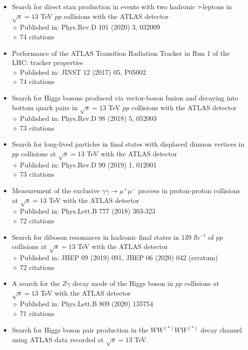 \documentclass[margin, 10pt]{res} %
\begin{document}
\begin{resume}
\begin{itemize}
\item Search for direct stau production in events with two hadronic $\tau$-leptons in $\sqrt{s} = 13$ TeV $pp$ collisions with the ATLAS detector\\
$\diamond$ Published in: Phys.Rev.D 101 (2020) 3, 032009\\
$\diamond$ 74 citations
\item Performance of the ATLAS Transition Radiation Tracker in Run 1 of the LHC: tracker properties\\
$\diamond$ Published in: JINST 12 (2017) 05, P05002\\
$\diamond$ 74 citations
\item Search for Higgs bosons produced via vector-boson fusion and decaying into bottom quark pairs in $\sqrt{s} = 13$ TeV $pp$ collisions with the ATLAS detector\\
$\diamond$ Published in: Phys.Rev.D 98 (2018) 5, 052003\\
$\diamond$ 73 citations
\item Search for long-lived particles in final states with displaced dimuon vertices in $pp$ collisions at $\sqrt{s} = 13$ TeV with the ATLAS detector\\
$\diamond$ Published in: Phys.Rev.D 99 (2019) 1, 012001\\
$\diamond$ 73 citations
\item Measurement of the exclusive $\gamma \gamma \rightarrow \mu^{+} \mu^{-}$ process in proton-proton collisions at $\sqrt{s} = 13$ TeV with the ATLAS detector\\
$\diamond$ Published in: Phys.Lett.B 777 (2018) 303-323\\
$\diamond$ 72 citations
\item Search for diboson resonances in hadronic final states in 139 fb$^{-1}$ of $pp$ collisions at $\sqrt{s} = 13$ TeV with the ATLAS detector\\
$\diamond$ Published in: JHEP 09 (2019) 091, JHEP 06 (2020) 042 (erratum)\\
$\diamond$ 72 citations
\item A search for the $Z\gamma$ decay mode of the Higgs boson in $pp$ collisions at $\sqrt{s} = 13$ TeV with the ATLAS detector\\
$\diamond$ Published in: Phys.Lett.B 809 (2020) 135754\\
$\diamond$ 71 citations
\item Search for Higgs boson pair production in the $WW^{(*)}WW^{(*)}$ decay channel using ATLAS data recorded at $\sqrt{s} = 13$ TeV\\

\end{itemize}
\end{resume}
\end{document}
